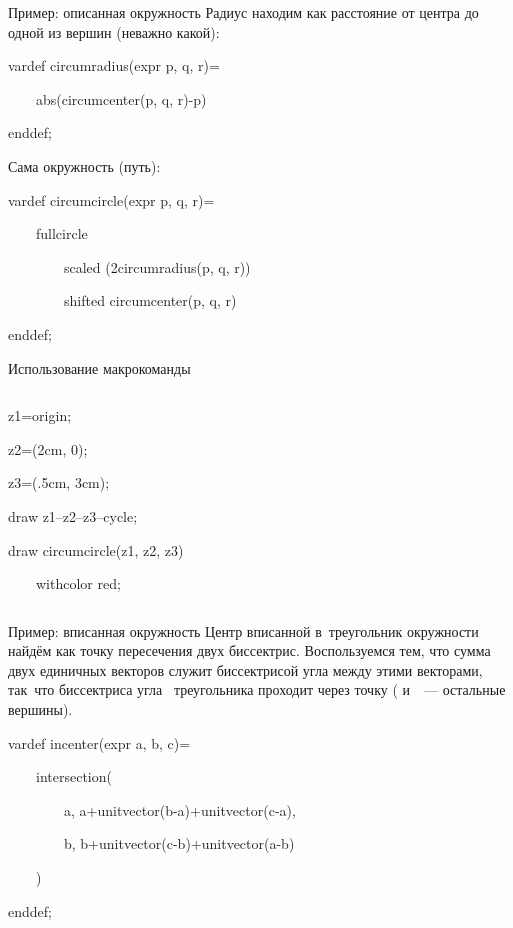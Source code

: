 \begin{frame}{Пример: описанная окружность}
Радиус находим как расстояние от центра до одной из вершин (неважно какой):
\begin{programlisting}
vardef circumradius(expr p, q, r)=\par
~~~~abs(circumcenter(p, q, r)-p)\par
enddef;
\end{programlisting}

Сама окружность (путь):
\begin{programlisting}
vardef circumcircle(expr p, q, r)=\par
~~~~fullcircle\par
~~~~~~~~scaled (2circumradius(p, q, r))\par
~~~~~~~~shifted circumcenter(p, q, r)\par
enddef;
\end{programlisting}
\end{frame}

\begin{frame}{Использование макрокоманды }
\begin{columns}
\begin{programlisting}
z1=origin;\par
z2=(2cm, 0);\par
z3=(.5cm, 3cm);\par
draw z1--z2--z3--cycle;\par
draw circumcircle(z1, z2, z3)\par
~~~~withcolor red;
\end{programlisting}
\end{columns}
\end{frame}

\begin{frame}{Пример: вписанная окружность}
Центр вписанной в~треугольник окружности найдём как точку пересечения двух
биссектрис. Воспользуемся тем, что сумма двух единичных векторов служит
биссектрисой угла между этими векторами, так~что биссектриса угла~
треугольника проходит через точку 
( и~~— остальные вершины).
\begin{programlisting}
vardef incenter(expr a, b, c)=\par
~~~~intersection(\par
~~~~~~~~a, a+unitvector(b-a)+unitvector(c-a),\par
~~~~~~~~b, b+unitvector(c-b)+unitvector(a-b)\par
~~~~)\par
enddef;
\end{programlisting}
\end{frame}

